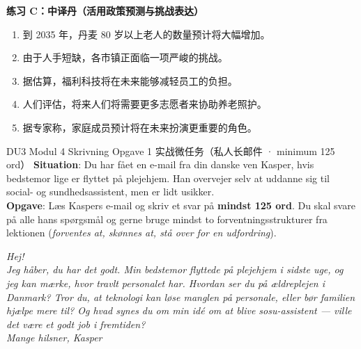 \textbf{练习 C：中译丹（活用政策预测与挑战表达）}
\begin{enumerate}
  \item 到 2035 年，丹麦 80 岁以上老人的数量预计将大幅增加。
  \item 由于人手短缺，各市镇正面临一项严峻的挑战。
  \item 据估算，福利科技将在未来能够减轻员工的负担。
  \item 人们评估，将来人们将需要更多志愿者来协助养老照护。
  \item 据专家称，家庭成员预计将在未来扮演更重要的角色。
\end{enumerate}


\begin{emailbox}{DU3 Modul 4 Skrivning Opgave 1 实战微任务（私人长邮件 · minimum 125 ord）}
\textbf{Situation}: Du har fået en e-mail fra din danske ven Kasper, hvis bedstemor lige er flyttet på plejehjem. Han overvejer selv at uddanne sig til social- og sundhedsassistent, men er lidt usikker.\\
\textbf{Opgave}: Læs Kaspers e-mail og skriv et svar på \textbf{mindst 125 ord}. Du skal svare på alle hans spørgsmål og gerne bruge mindst to forventningsstrukturer fra lektionen (\textit{forventes at, skønnes at, stå over for en udfordring}).

\vspace{0.3em}
\textit{Hej!\\
Jeg håber, du har det godt. Min bedstemor flyttede på plejehjem i sidste uge, og jeg kan mærke, hvor travlt personalet har. Hvordan ser du på ældreplejen i Danmark? Tror du, at teknologi kan løse manglen på personale, eller bør familien hjælpe mere til? Og hvad synes du om min idé om at blive sosu-assistent --- ville det være et godt job i fremtiden?\\
Mange hilsner, Kasper}
\end{emailbox}

